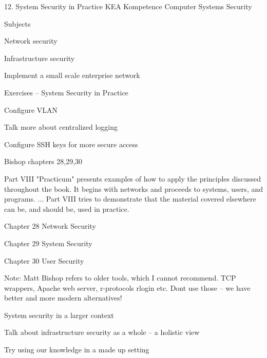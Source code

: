 \documentclass[Screen16to9,17pt]{foils}
\begin{document}
\mytitlepage
{12. System Security in Practice}
{KEA Kompetence Computer Systems Security \the\year}



\begin{list1}
\item Subjects
\begin{list2}
\item Network security
\item Infrastructure security
\item Implement a small scale enterprise network
\end{list2}
\item Exercises -- System Security in Practice
\begin{list2}
\item Configure VLAN
\item Talk more about centralized logging
\item Configure SSH keys for more secure access
\end{list2}
\end{list1}



\begin{list1}
\item Bishop chapters 28,29,30
\item Part VIII "Practicum" presents examples of how to apply the principles discussed throughout the book. It begins with networks and proceeds to systems, users, and programs. ... Part VIII tries to demonstrate that the material covered elsewhere can be, and should be, used in practice.

\item Chapter 28 Network Security
\item Chapter 29 System Security
\item Chapter 30 User Security
\end{list1}

Note: Matt Bishop refers to older tools, which I cannot recommend. TCP wrappers, Apache web server, r-protocols rlogin etc. Dont use those -- we have better and more modern alternatives!


 
\begin{list2}
\item System security in a larger context
\item Talk about infrastructure security as a whole -- a holistic view
\item Try using our knowledge in a made up setting
\end{list2}
\end{document}
